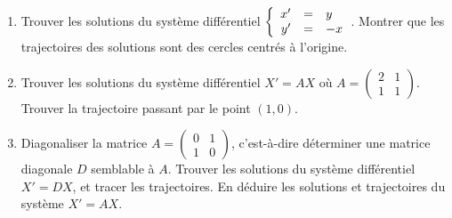 \documentclass[12pt, class=report,crop=false]{standalone}
\begin{document}
 
 
\begin{miniexercices}
\sauteligne
\begin{enumerate}
  \item Trouver les solutions du système différentiel 
    $\left\{\begin{array}{rcl}x'&=&y\cr y'&=&-x\end{array}\right.$. 
    Montrer que les trajectoires des solutions sont des cercles centrés à l'origine.
    
  \item Trouver les solutions du système différentiel $X'=AX$ où
  $A =  \left(\begin{smallmatrix}2&1\\1&1\end{smallmatrix} \right)$.
  Trouver la trajectoire passant par le point $(1,0)$.
  
  \item Diagonaliser la matrice $A =  \left(\begin{smallmatrix}0&1\\1&0\end{smallmatrix} \right)$,
  c'est-à-dire déterminer une matrice diagonale $D$ semblable à $A$.   
  Trouver les solutions du système différentiel $X'=DX$, et tracer les trajectoires.
  En déduire les solutions et trajectoires du système $X'=AX$.
  
\end{enumerate}
\end{miniexercices}







\finchapitre 
\end{document}
